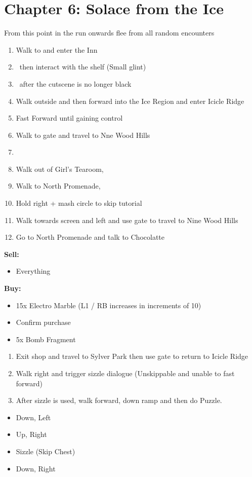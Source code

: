 \chapter{Chapter 6: Solace from the Ice}
From this point in the run onwards flee from all random encounters
\begin{enumerate}
	\item Walk to and enter the Inn
	\item \cs\ then interact with the shelf (Small glint)
	\item \cs\ after the cutscene is no longer black
	\item Walk outside and then forward into the Ice Region and enter Icicle Ridge
	\item Fast Forward until gaining control
	\item Walk to gate and travel to Nne Wood Hills
	\item \cs
	\item Walk out of Girl's Tearoom, \cs
	\item Walk to North Promenade, \cs
	\item Hold right + mash circle to skip tutorial
	\item Walk towards screen and left and use gate to travel to Nine Wood Hills
	\item Go to North Promenade and talk to Chocolatte
\end{enumerate}
\begin{shop}
\textbf{Sell:}
	\begin{itemize}
		\item Everything
	\end{itemize}
\textbf{Buy:}
	\begin{itemize}
		\item 15x Electro Marble (L1 / RB increases in increments of 10)
		\item Confirm purchase
		\item 5x Bomb Fragment
	\end{itemize}
\end{shop}
\begin{enumerate}[resume]
	\item Exit shop and travel to Sylver Park then use gate to return to Icicle Ridge
	\item Walk right and trigger sizzle dialogue (Unskippable and unable to fast forward)
	\item After sizzle is used, walk forward, down ramp and then do Puzzle.
\end{enumerate}
\begin{puzzle}
	\begin{itemize}
		\item Down, Left
		\item Up, Right
		\item Sizzle (Skip Chest)
		\item Down, Right
	\end{itemize}
\end{puzzle}
